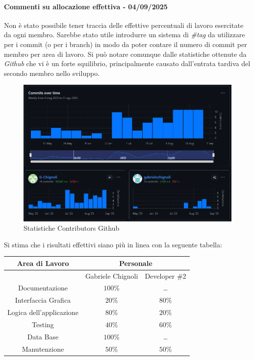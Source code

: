 \documentclass{article}
\begin{document}
\paragraph{Commenti su allocazione effettiva - 04/09/2025}
Non è stato possibile tener traccia delle effettive percentuali di lavoro esercitate da ogni membro. Sarebbe stato utile introdurre un sistema di \textit{\#tag} da utilizzare per i commit (o per i branch) in modo da poter contare il numero di commit per membro per area di lavoro. Si può notare comunque dalle statistiche ottenute da \textit{Github} che vi è un forte squilibrio, principalmente causato dall'entrata tardiva del secondo membro nello sviluppo.     

\begin{figure}[h]
    \centering
    \includegraphics[width=\textwidth]{imgs/commit.png}
    \caption{Statistiche Contributors Github}
    \label{fig:placeholder}
\end{figure}

Si stima che i risultati effettivi siano più in linea con la seguente tabella:

\begin{center}
    \begin{longtable}{ccc}
    \toprule
         \textbf{Area di Lavoro} & \multicolumn{2}{c}{\textbf{Personale}} \\
         \midrule
         & Gabriele Chignoli & Developer \#2 \\
    \midrule
         Documentazione & \color{green}$100\%$  & \color{red}\dots \\
         Interfaccia Grafica & \color{red}$20\%$ & \color{green} $80\%$  \\
         Logica dell'applicazione & $80\%$ &  $20\%$\\
         Testing & \color{green}$40\%$  & \color{red}$60\%$ \\
         Data Base & $100\%$  & \dots \\
         Manutenzione & $50\%$ & $50\%$  \\
    \bottomrule
    \end{longtable}
\end{center}
\end{document}
